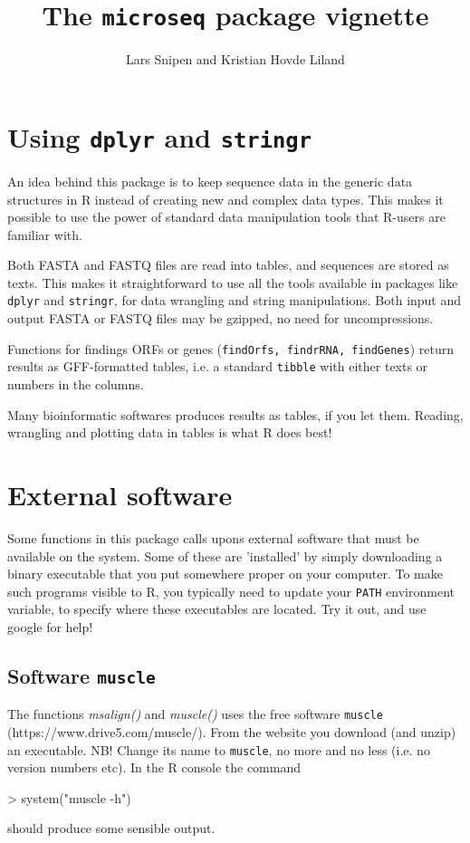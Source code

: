 \documentclass{article}
\title{The \texttt{microseq} package vignette}
\author{Lars Snipen and Kristian Hovde Liland}
\date{}
\begin{document}

\maketitle


\section{Using \texttt{dplyr} and \texttt{stringr}}
An idea behind this package is to keep sequence data in the generic data structures in R instead of creating new and complex data types. This makes it possible to use the power of standard data manipulation tools that R-users are familiar with.

Both FASTA and FASTQ files are read into tables, and sequences are stored as texts. This makes it straightforward to use all the tools available in packages like \texttt{dplyr} and \texttt{stringr}, for data wrangling and string manipulations. Both input and output FASTA or FASTQ files may be gzipped, no need for uncompressions.

Functions for findings ORFs or genes (\texttt{findOrfs, findrRNA, findGenes}) return results as GFF-formatted tables, i.e. a standard \texttt{tibble} with either texts or numbers in the columns.

Many bioinformatic softwares produces results as tables, if you let them. Reading, wrangling and plotting data in tables is what R does best!




\section{External software}
Some functions in this package calls upons external software that must be available on the system. Some of these are 'installed' by simply downloading a binary executable that you put somewhere proper on your computer. To make such programs visible to R, you typically need to update your \texttt{PATH} environment variable, to specify where these executables are located. Try it out, and use google for help!


\subsection{Software \texttt{muscle}}
The functions \emph{msalign()} and \emph{muscle()} uses the free software \texttt{muscle} (https://www.drive5.com/muscle/). From the website you download (and unzip) an executable. NB! Change its name to \texttt{muscle}, no more and no less (i.e. no version numbers etc). In the R console the command
\begin{Schunk}
\begin{Sinput}
> system("muscle -h")
\end{Sinput}
\end{Schunk}
should produce some sensible output.
\end{document}
